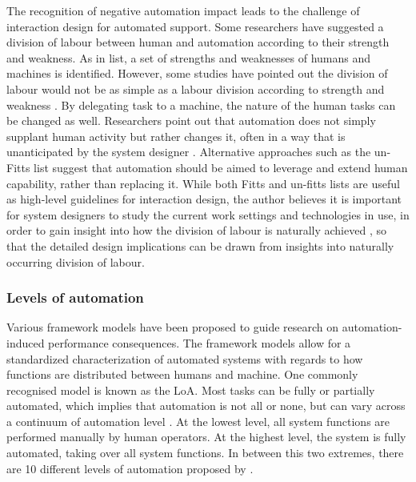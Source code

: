 The recognition of negative automation impact leads to the challenge of interaction design for automated support.  Some researchers have suggested a division of labour between human and automation according to their strength and weakness. As in \cite{Fitts} list, a set of strengths and weaknesses of humans and machines is identified. However, some studies have pointed out the division of labour would not be as simple as a labour division according to strength and weakness \citep{Bradshaw2011}. By delegating task to a machine, the nature of the human tasks can be changed as well. Researchers point out that automation does not simply supplant human activity but rather changes it, often in a way that is unanticipated by the system designer \citep{Bradshaw2011}. Alternative approaches such as the un-Fitts list \citep{Hoffman2002} suggest that automation should be aimed to leverage and extend human capability, rather than replacing it.  While both Fitts and un-fitts lists are useful as high-level guidelines for interaction design, the author believes it is important for system designers to study the current work settings and technologies in use, in order to gain insight into how the division of labour is naturally achieved \citep{Crabtree2012}, so that the detailed design implications can be drawn from insights into naturally occurring division of labour. \\


\subsubsection{Levels of automation}\label{sec:lrloa}
Various framework models have been proposed to guide research on automation-induced performance consequences. The framework models allow for a standardized characterization of automated systems with regards to how functions are distributed between humans and machine. One commonly recognised model is known as the \acf{LoA}. Most tasks can be fully or partially automated, which implies that automation is not all or none, but can vary across a continuum of automation level \citep{Wickens2010}. At the lowest level, all system functions are performed manually by human operators.  At the highest level, the system is fully automated, taking over all system functions. In between this two extremes, there are 10 different levels of automation proposed by \citep{Wickens2010}. \\

